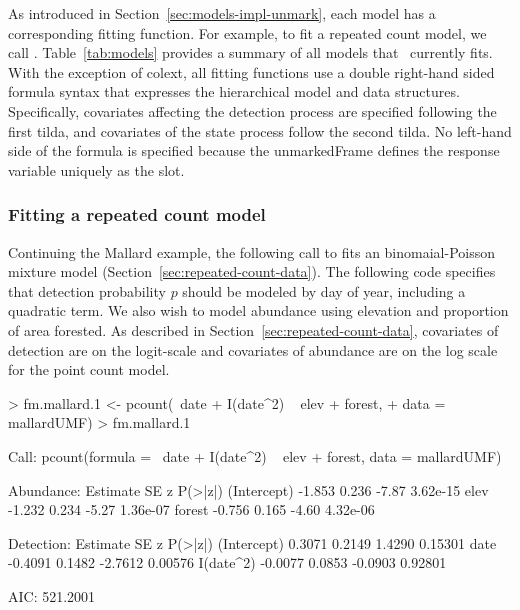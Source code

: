 \documentclass[article,shortnames]{jss}
\newcommand{\um}{\pkg{unmarked}}
\begin{document}
As introduced in Section~\ref{sec:models-impl-unmark}, each model has a
corresponding fitting function.  For example, to fit a repeated count
model, we call .  Table~\ref{tab:models} provides a
summary of all models that \um\ currently fits.  With the exception of colext,
all fitting functions use a double right-hand sided formula syntax that expresses the hierarchical model and data structures.  Specifically, covariates affecting the detection process are specified following the first tilda, and covariates of the state process follow the second tilda. No left-hand side of the formula is specified because the unmarkedFrame defines the response variable
uniquely as the  slot.

\subsubsection{Fitting a repeated count model}

Continuing the Mallard example, the following call to  fits an binomaial-Poisson mixture model (Section~\ref{sec:repeated-count-data}).  The following code specifies that detection probability $p$ should be modeled by day of year, including a quadratic term.  We also wish to model abundance using elevation and proportion of area forested.  As described in Section~\ref{sec:repeated-count-data}, covariates of detection are on the logit-scale and covariates of abundance are on the log scale for the point count model.

\begin{Schunk}
\begin{Sinput}
> fm.mallard.1 <- pcount(~date + I(date^2) ~ elev + forest, 
+     data = mallardUMF)
> fm.mallard.1
\end{Sinput}
\begin{Soutput}
Call:
pcount(formula = ~date + I(date^2) ~ elev + forest, data = mallardUMF)

Abundance:
            Estimate    SE     z  P(>|z|)
(Intercept)   -1.853 0.236 -7.87 3.62e-15
elev          -1.232 0.234 -5.27 1.36e-07
forest        -0.756 0.165 -4.60 4.32e-06

Detection:
            Estimate     SE       z P(>|z|)
(Intercept)   0.3071 0.2149  1.4290 0.15301
date         -0.4091 0.1482 -2.7612 0.00576
I(date^2)    -0.0077 0.0853 -0.0903 0.92801

AIC: 521.2001 
\end{Soutput}
\end{Schunk}
\end{document}
